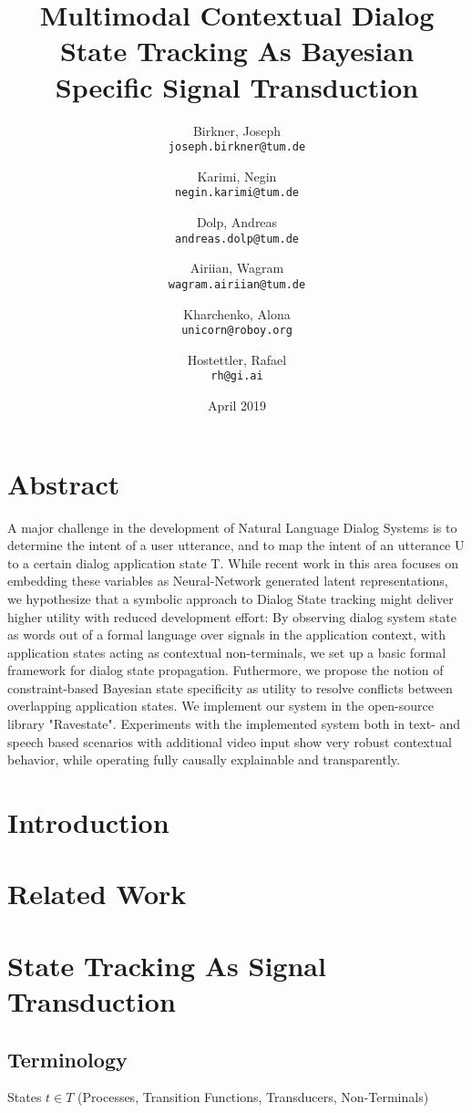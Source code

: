 \documentclass{article}
\title{Multimodal Contextual Dialog State Tracking As Bayesian Specific Signal Transduction}
\author{
	Birkner, Joseph \\ \texttt{joseph.birkner@tum.de}
	\and
	Karimi, Negin \\ \texttt{negin.karimi@tum.de}
	\and
	Dolp, Andreas \\ \texttt{andreas.dolp@tum.de}
	\and
	Airiian, Wagram\\ \texttt{wagram.airiian@tum.de}
	\and
	Kharchenko, Alona \\ \texttt{unicorn@roboy.org}
	\and
	Hostettler, Rafael \\ \texttt{rh@gi.ai}
}
\date{April 2019}
\begin{document}
\maketitle

\section{Abstract}

A major challenge in the development of Natural Language Dialog Systems is to determine the intent of a user utterance, and to map the intent of an utterance U to a certain dialog application state T.
While recent work in this area focuses on embedding these variables as Neural-Network generated latent representations, we hypothesize that a symbolic approach to Dialog State tracking might deliver higher utility with reduced development effort:
By observing dialog system state as words out of a formal language over signals in the application context, with application states acting as contextual non-terminals, we set up a basic formal framework for dialog state propagation.
Futhermore, we propose the notion of constraint-based Bayesian state specificity as utility to resolve conflicts between overlapping application states. We implement our system in the open-source library "Ravestate".
Experiments with the implemented system both in text- and speech based scenarios with additional video input show very robust contextual behavior, while operating fully causally explainable and transparently.

\section{Introduction}


\section{Related Work}


\section{State Tracking As Signal Transduction}


\subsection{Terminology}

States $t \in T$ (Processes, Transition Functions, Transducers, Non-Terminals)
\end{document}
